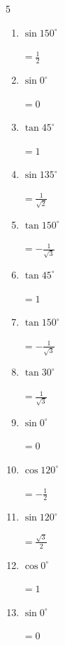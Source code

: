 \begin{multicols}{5}
\begin{enumerate}
  \item $\displaystyle \sin{150^\circ}$

        $\displaystyle =\frac{1}{2}$

  \item $\displaystyle \sin{0^\circ}$

        $\displaystyle =0$

  \item $\displaystyle \tan{45^\circ}$

        $\displaystyle =1$

  \item $\displaystyle \sin{135^\circ}$

        $\displaystyle =\frac{1}{\sqrt{2}}$

  \item $\displaystyle \tan{150^\circ}$

        $\displaystyle =-\frac{1}{\sqrt{3}}$

  \item $\displaystyle \tan{45^\circ}$

        $\displaystyle =1$

  \item $\displaystyle \tan{150^\circ}$

        $\displaystyle =-\frac{1}{\sqrt{3}}$

  \item $\displaystyle \tan{30^\circ}$

        $\displaystyle =\frac{1}{\sqrt{3}}$

  \item $\displaystyle \sin{0^\circ}$

        $\displaystyle =0$

\columnbreak %

\resetques

  \item $\displaystyle \cos{120^\circ}$

        $\displaystyle =-\frac{1}{2}$

  \item $\displaystyle \sin{120^\circ}$

        $\displaystyle =\frac{\sqrt{3}}{2}$

  \item $\displaystyle \cos{0^\circ}$

        $\displaystyle =1$

  \item $\displaystyle \sin{0^\circ}$

        $\displaystyle =0$


\end{enumerate}
\end{multicols}
